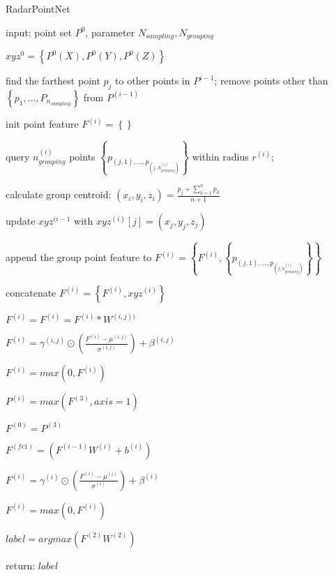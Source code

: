 \documentclass{article}
\begin{document}
\begin{algorithm}
    \caption{RadarPointNet}
    input: point set $P^{0}$, parameter $N_{sampling}, N_{grouping}$
    
    $xyz^{0}=\left\{P^{0}(X),P^{0}(Y),P^{0}(Z)\right\}$     
    
     {%
     {%
    find the farthest point $p_{j}$ to other points in $P^{i-1}$;
    }
    remove points other than $\left\{p_{1},...,P_{n_{sampling}}\right\}$ from $P^{(i-1)}$
    
    init point feature $F^{(i)}=\left\{\right\}$
    
     {%
    query $n^{(i)}_{grouping}$ points $\left\{p_{(j,1),...,p_{(j,N^{(i)}_{grouping})}}\right\}$ within radius $r^{(i)}$;
    
    calculate group centroid: $(x_{i},y_{i},z_{i})=\frac{p_{j}+\sum_{k=1}^{n}p_{k}}{n+1}$
    
    update $xyz^{(i-1}$ with $xyz^{(i)}[j]=(x_{j},y_{j},z_{j})$
    
    append the group point feature to $F^{(i)}=\left\{F^{(i)},\left\{p_{(j,1),...,p_{(j,n^{(i)}_{grouping})}}\right\}\right\}$
    }
    
    concatenate $F^{(i)}=\left\{F^{(i)},xyz^{(i)}\right\}$
    
     {%
    $F^{(i)}=F^{(i)}=F^{(i)}\ast W^{(i,j))}$ 
    
    $F^{(i)}=\gamma^{(i,j)}\odot\left ( \frac{F^{(i)}-\mu^{(i,j)} }{\sigma^{(i,j)} } \right ) +\beta^{(i,j)} $ 
    
    $F^{(i)}=max(0, F^{(i)})$ 
    }
    
    $P^{(i)}=max(F^{(3)}, axis=1)$ 
    }
    
    $F^{(0)}=P^{(3)}$
    
     {%
    $F^{(fc1)}=\left ( F^{(i-1)}W^{(i)}+b^{(i)} \right )$ 

    $F^{(i)}=\gamma^{(i)}\odot\left ( \frac{F^{(i)}-\mu^{(i)} }{\sigma^{(i)} } \right ) +\beta^{(i)} $ 

    $F^{(i)}=max(0, F^{(i)})$ 
    }

    $label=argmax\left ( F^{(2)}W^{(2)} \right )$

    return: $label$ 
\end{algorithm}
\end{document}
